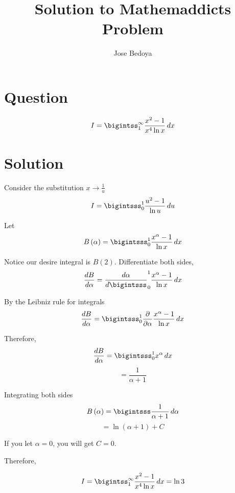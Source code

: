 \documentclass{article}
\begin{document}
\pagecolor{Green}
\title{Solution to Mathemaddict\textsc{}s Problem}
\author{Jose Bedoya}
\maketitle
\section{Question}
{\LARGE
$$I = \bigintss_{1}^{\infty} \frac{x^2-1}{x^4 \ln x}\, dx$$
}
\section{Solution}
\vspace{5mm}
{\Large
Consider the substitution $x \rightarrow \frac{1}{u}$
$$ I = \bigintsss_{0}^{1} \frac{u^2-1}{\ln u}\,du$$

\vspace{5mm}
Let
$$ B\left(\alpha \right) = \bigintsss_{0}^{1} \frac{x^{\alpha} -1}{\ln x}\, dx$$

\vspace{3mm}
Notice our desire integral is $B\left(2\right)$.
\newpage
Differentiate both sides,
$$\dv{B}{\alpha} = \dv{\alpha}\bigintsss_{0}^{1} \frac{x^{\alpha}-1}{\ln x}\, dx$$

\vspace{3mm}
By the Leibniz rule for integrals
$$\dv{B}{\alpha}=\bigintsss_{0}^{1}\pdv{\alpha}\frac{x^{\alpha}-1}{\ln x}\, dx$$

\vspace{3mm}
Therefore,
$$\dv{B}{\alpha}=\bigintsss_{0}^{1} x^{\alpha}\,dx$$
$$=\frac{1}{\alpha+1}$$

\vspace{3mm}
Integrating both sides
$$B\left(\alpha\right)=\bigintsss \frac{1}{\alpha+1}\,d\alpha$$
$$=\ln (\alpha+1)+C$$

\vspace{2mm}
If you let $\alpha=0$, you will get $C=0$.

\vspace{7mm}
Therefore,
}

{\LARGE
$$I = \bigintss_{1}^{\infty} \frac{x^2-1}{x^4 \ln x}\, dx=\ln3$$
}
\end{document}

